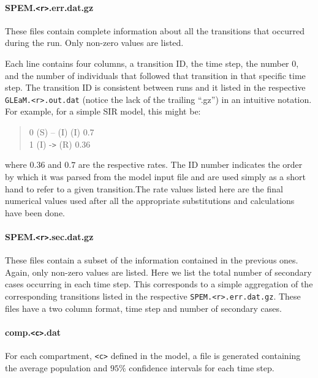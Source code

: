 \documentclass[a4paper, 11pt, fleqn]{paper}
\begin{document}
\paragraph*{SPEM.\texttt{<r>}.err.dat.gz}

These files contain complete information about all the transitions that occurred during the run. Only non-zero values are listed.

Each line contains four columns, a transition ID, the time step, the number $0$, and the number of individuals that followed that transition in that specific time step.  The transition ID is consistent between runs and it listed in the respective \texttt{GLEaM.\texttt{<r>}.out.dat} (notice the lack of the trailing ``.gz'') in an intuitive notation. For example, for a simple SIR model, this might be:

\begin{center}
\begin{quote}
0 (S) -- (I) (I) 0.7\\
1 (I) -\texttt{>} (R) 0.36\\
\end{quote}
\end{center}

where $0.36$ and $0.7$ are the respective rates. The ID number indicates the order by which it was parsed from the model input file and are used simply as a short hand to refer to a given transition.The rate values listed here are the final numerical values used after all the appropriate substitutions and calculations have been done. 

\paragraph*{SPEM.\texttt{<r>}.sec.dat.gz}

These files contain a subset of the information contained in the previous ones. Again, only non-zero values are listed.  Here we list the total number of secondary cases occurring in each time step. This corresponds to a simple aggregation of the corresponding transitions listed in the respective \texttt{SPEM.<r>.err.dat.gz}. These files have a two column format, time step and number of secondary cases.

\paragraph*{comp.\texttt{<c>}.dat}

For each compartment, \texttt{<c>} defined in the model, a file is generated containing the average population and $95\%$ confidence intervals for each time step.
\end{document}
